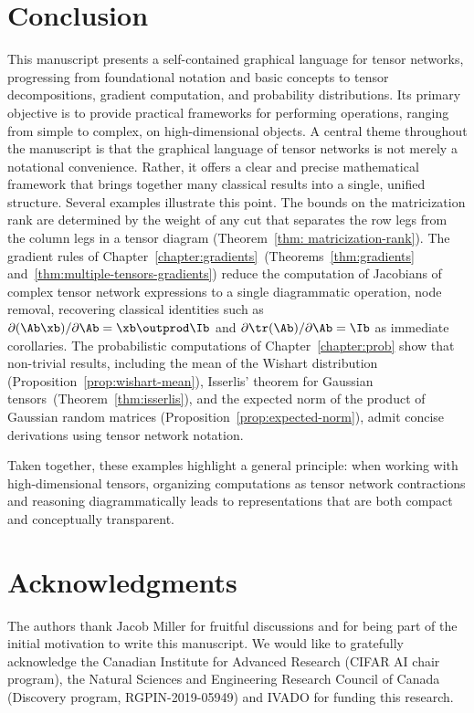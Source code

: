 \section{Conclusion}\label{chapter:conclusion}

This manuscript presents a self-contained graphical language for tensor networks, progressing from foundational notation and basic concepts to tensor decompositions, gradient computation, and probability distributions. Its primary objective is to provide practical frameworks for performing operations, ranging from simple to complex, on high-dimensional objects.
A central theme throughout the manuscript is that the graphical language of tensor
networks is not merely a notational convenience. Rather, it offers a clear and precise mathematical framework that brings together many classical results into a single, unified structure.
Several examples illustrate this point. The bounds on the matricization rank are determined by the weight of any cut that separates the row legs from the column legs in a tensor diagram (Theorem~\ref{thm: matricization-rank}). The gradient rules of Chapter~\ref{chapter:gradients}~(Theorems~\ref{thm:gradients} and~\ref{thm:multiple-tensors-gradients}) reduce the computation
of Jacobians of complex tensor network expressions to a single diagrammatic operation,
node removal, recovering classical identities such as
$\partial(\Ab\xb)/\partial \Ab = \xb \outprod \Ib$ and $\partial \tr(\Ab)/\partial \Ab = \Ib$
as immediate corollaries. The probabilistic computations of Chapter~\ref{chapter:prob} show that
non-trivial results, including the mean of the Wishart distribution (Proposition~\ref{prop:wishart-mean}), Isserlis' theorem for Gaussian tensors~(Theorem~\ref{thm:isserlis}), and the expected norm of the product of Gaussian random matrices (Proposition~\ref{prop:expected-norm}), admit concise derivations using tensor network notation.

Taken together, these examples highlight a general principle: when working with
high-dimensional tensors, organizing computations as tensor network contractions
and reasoning diagrammatically leads to representations that are both compact and
conceptually transparent.

















\section*{Acknowledgments}
The authors thank Jacob Miller for fruitful discussions and for being part of the initial motivation to write this manuscript.
We would like to gratefully acknowledge the Canadian Institute for Advanced Research (CIFAR AI chair program), the Natural Sciences and Engineering
Research Council of Canada (Discovery program, RGPIN-2019-05949) and IVADO for funding this research.
